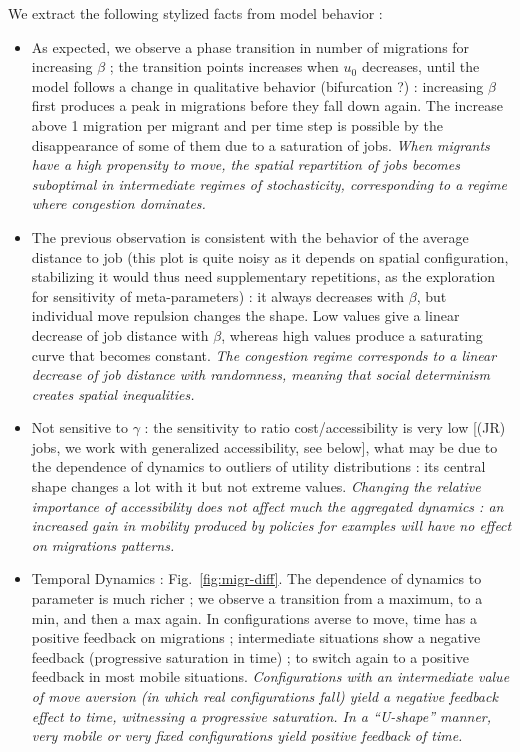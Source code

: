 We extract the following stylized facts from model behavior :
\begin{itemize}
\item As expected, we observe a phase transition in number of migrations for increasing $\beta$ ; the transition points increases when $u_0$ decreases, until the model follows a change in qualitative behavior (bifurcation ?) : increasing $\beta$ first produces a peak in migrations before they fall down again. The increase above 1 migration per migrant and per time step is possible by the disappearance of some of them due to a saturation of jobs. \textit{When migrants have a high propensity to move, the spatial repartition of jobs becomes suboptimal in intermediate regimes of stochasticity, corresponding to a regime where congestion dominates.} 
\item The previous observation is consistent with the behavior of the average distance to job (this plot is quite noisy as it depends on spatial configuration, stabilizing it would thus need supplementary repetitions, as the exploration for sensitivity of meta-parameters) : it always decreases with $\beta$, but individual move repulsion changes the shape. Low values give a linear decrease of job distance with $\beta$, whereas high values produce a saturating curve that becomes constant. \textit{The congestion regime corresponds to a linear decrease of job distance with randomness, meaning that social determinism creates spatial inequalities.}
\item Not sensitive to $\gamma$ : the sensitivity to ratio cost/accessibility is very low [(JR) jobs, we work with generalized accessibility, see below], what may be due to the dependence of dynamics to outliers of utility distributions : its central shape changes a lot with it but not extreme values. \textit{Changing the relative importance of accessibility does not affect much the aggregated dynamics : an increased gain in mobility produced by policies for examples will have no effect on migrations patterns.} 
\item Temporal Dynamics : Fig.~\ref{fig:migr-diff}. The dependence of dynamics to parameter is much richer ; we observe a transition from a maximum, to a min, and then a max again. In configurations averse to move, time has a positive feedback on migrations ; intermediate situations show a negative feedback (progressive saturation in time) ; to switch again to a positive feedback in most mobile situations. \textit{Configurations with an intermediate value of move aversion (in which real configurations fall) yield a negative feedback effect to time, witnessing a progressive saturation. In a ``U-shape'' manner, very mobile or very fixed configurations yield positive feedback of time.} 
\end{itemize}




